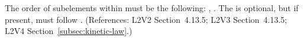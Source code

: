 The order of subelements within \KineticLaw must be the following:
, .  The  is
optional, but if present, must follow .  (References: L2V2
Section~4.13.5; L2V3 Section~4.13.5; L2V4 Section~\ref{subsec:kinetic-law}.)
